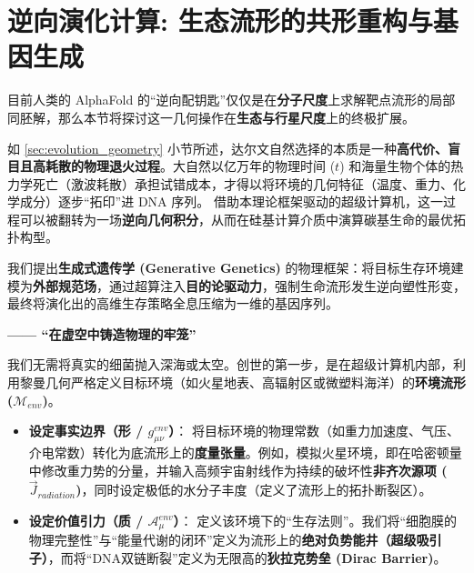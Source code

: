 \section{逆向演化计算: 生态流形的共形重构与基因生成}
\label{sec:reverse_evolutionary_computation}

目前人类的 AlphaFold 的“逆向配钥匙”仅仅是在\textbf{分子尺度}上求解靶点流形的局部同胚解，那么本节将探讨这一几何操作在\textbf{生态与行星尺度}上的终极扩展。

如 \ref{sec:evolution_geometry} 小节所述，达尔文自然选择的本质是一种\textbf{高代价、盲目且高耗散的物理退火过程}。大自然以亿万年的物理时间 ($t$) 和海量生物个体的热力学死亡（激波耗散）承担试错成本，才得以将环境的几何特征（温度、重力、化学成分）逐步“拓印”进 DNA 序列。
借助本理论框架驱动的超级计算机，这一过程可以被翻转为一场\textbf{逆向几何积分}，从而在硅基计算介质中演算碳基生命的最优拓扑构型。

我们提出\textbf{生成式遗传学 (Generative Genetics)} 的物理框架：将目标生存环境建模为\textbf{外部规范场}，通过超算注入\textbf{目的论驱动力}，强制生命流形发生逆向塑性形变，最终将演化出的高维生存策略全息压缩为一维的基因序列。


\textbf{—— “在虚空中铸造物理的牢笼”}

我们无需将真实的细菌抛入深海或太空。创世的第一步，是在超级计算机内部，利用黎曼几何严格定义目标环境（如火星地表、高辐射区或微塑料海洋）的\textbf{环境流形 ($\mathcal{M}_{env}$)}。

\begin{itemize}
    \item \textbf{\textcolor{structurecolor}{设定事实边界（形 / $g_{\mu\nu}^{env}$）}}：
    将目标环境的物理常数（如重力加速度、气压、介电常数）转化为底流形上的\textbf{度量张量}。例如，模拟火星环境，即在哈密顿量中修改重力势的分量，并输入高频宇宙射线作为持续的破坏性\textbf{非齐次源项 ($\vec{J}_{radiation}$)}，同时设定极低的水分子丰度（定义了流形上的拓扑断裂区）。

    \item \textbf{\textcolor{structurecolor}{设定价值引力（质 / $\mathcal{A}_\mu^{env}$）}}：
    定义该环境下的“生存法则”。我们将“细胞膜的物理完整性”与“能量代谢的闭环”定义为流形上的\textbf{绝对负势能井（超级吸引子）}，而将“DNA双链断裂”定义为无限高的\textbf{狄拉克势垒 (Dirac Barrier)}。
\end{itemize}


